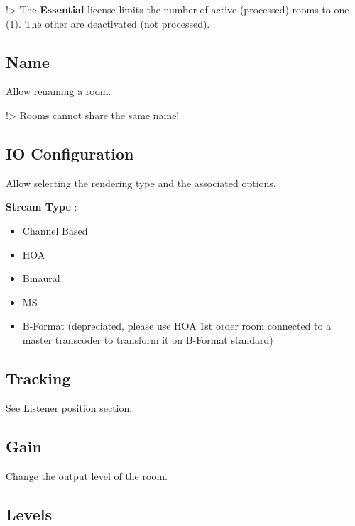 \documentclass[
  letterpaper,
  DIV=11,
  numbers=noendperiod]{scrreport}
\providecommand{\tightlist}{%
  \setlength{\itemsep}{0pt}\setlength{\parskip}{0pt}}\usepackage{longtable,booktabs,array}
\begin{document}
!\textgreater{} The \textbf{Essential} license limits the number of
active (processed) rooms to one (1). The other are deactivated (not
processed).

\hypertarget{name-2}{%
\subsection{Name}\label{name-2}}

Allow renaming a room.

!\textgreater{} Rooms cannot share the same name!

\hypertarget{io-configuration-1}{%
\subsection{IO Configuration}\label{io-configuration-1}}

Allow selecting the rendering type and the associated options.

\textbf{Stream Type} :

\begin{itemize}
\tightlist
\item
  Channel Based
\item
  HOA
\item
  Binaural
\item
  MS
\item
  B-Format (depreciated, please use HOA 1st order room connected to a
  master transcoder to transform it on B-Format standard)
\end{itemize}

\hypertarget{tracking-1}{%
\subsection{Tracking}\label{tracking-1}}

See \href{Spatialisation_Technology_Listener_Position.md}{Listener
position section}.

\hypertarget{gain-1}{%
\subsection{Gain}\label{gain-1}}

Change the output level of the room.

\hypertarget{levels-2}{%
\subsection{Levels}\label{levels-2}}
\end{document}

